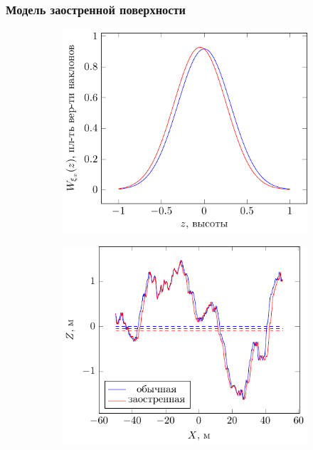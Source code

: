 \documentclass[10pt,pdf,hyperref={unicode}, dvipsnames]{beamer}
\begin{document}
\begin{frame}[t]
	\frametitle{Модель заостренной поверхности}
    \begin{figure}[h]
        \begin{subfigure}{0.49\linewidth}
            \centering
            \includegraphics[width=\linewidth]{fig/water/pdf_cwm}
        \end{subfigure}
        \begin{subfigure}{0.49\linewidth}
            \centering
            \includegraphics[width=\linewidth]{fig/water/surface_cwm}
        \end{subfigure}

\end{figure}
\end{frame}
\end{document}
